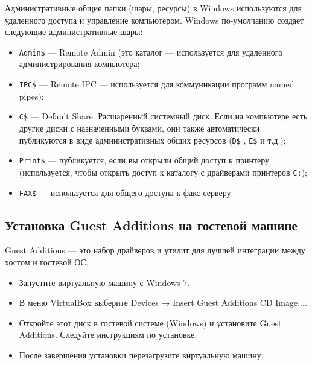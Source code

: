 
Административные общие папки (шары, ресурсы) в Windows используются
для удаленного доступа и управление компьютером.
Windows по-умолчанию создает следующие административные шары:

\begin{itemize}
	\item \verb|Admin$| --- Remote Admin (это каталог %
		--- используется для удаленного администрирования компьютера;
	\item \verb|IPC$|
		--- Remote IPC --- используется для коммуникации программ named pipes);
	\item \verb|C$| --- Default Share. Расшаренный системный диск.
		Если на компьютере есть другие диски с назначенными буквами,
		они также автоматически публикуются
		в виде административных общих ресурсов (\verb|D$| , \verb|E$| и т.д.);
	\item \verb|Print$| --- публикуется, если вы открыли общий доступ
		к принтеру (используется, чтобы открыть доступ к каталогу
		с драйверами принтеров \texttt{C:\Windows{}\spool\drivers});
	\item \verb|FAX$| --- используется для общего доступа к факс-серверу.
\end{itemize}

\subsection{Установка Guest Additions на гостевой машине}
Guest Additions --- это набор драйверов
и утилит для лучшей интеграции между хостом и гостевой ОС.

\begin{itemize}
	\item Запустите виртуальную машину с Windows 7.
	\item В меню VirtualBox выберите
		Devices → Insert Guest Additions CD Image....
	\item Откройте этот диск в гостевой системе (Windows)
		и установите Guest Additions. Следуйте инструкциям по установке.
	\item После завершения установки перезагрузите виртуальную машину.
\end{itemize}

